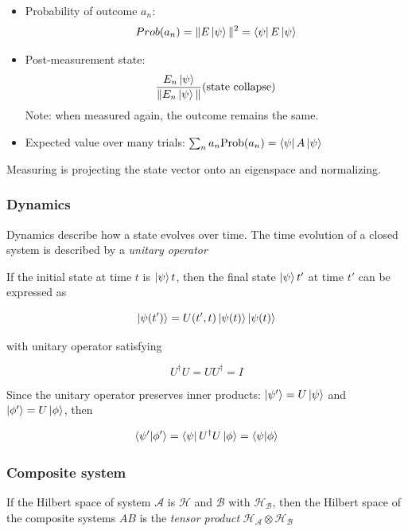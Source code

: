 \documentclass[11pt]{article}
\begin{document}
\begin{itemize}
	\item Probability of outcome $a_n$:
	      \[
		      Prob(a_n) = \|E\ket{\psi}\|^2 = \bra{\psi}E\ket{\psi}
	      \]
	\item Post-measurement state:
	      \[
		      \frac{E_n \ket{\psi}}{\|E_n\ket{\psi}\|} \text{(state collapse)}
	      \]
	      Note: when measured again, the outcome remains the same.

	\item Expected value over many trials: $\sum_n a_n \text{Prob}(a_n) = \bra{\psi}A\ket{\psi}$
\end{itemize}

Measuring is projecting the state vector onto an eigenspace and normalizing.

\subsubsection{Dynamics}

Dynamics describe how a state evolves over time. The time evolution of a closed system is described by a \textit{unitary operator}

If the initial state at time $t$ is $\ket{\psi}t$, then the final state $\ket{\psi}t'$ at time $t'$ can be expressed as

\begin{equation*}
	\ket{\psi(t')} = U(t', t)\ket{\psi(t)}\ket{\psi(t)}
\end{equation*}

with unitary operator satisfying

\begin{equation*}
	U^{\dagger}U = UU^{\dagger} = I
\end{equation*}

Since the unitary operator preserves inner products: $\ket{\psi'} = U\ket{\psi}$ and $\ket{\phi'} = U\ket{\phi}$, then

\begin{equation*}
	\braket{\psi'|\phi'} = \bra{\psi}U^{\dagger}U\ket{\phi} = \braket{\psi|\phi}
\end{equation*}


\subsubsection{Composite system}

If the Hilbert space of system $\mathcal{A}$ is $\mathcal{H}$ and $\mathcal{B}$ with $\mathcal{H}_{\mathcal{B}}$, then the Hilbert space of the composite systems $AB$ is the \textit{tensor product} $\mathcal{H}_{\mathcal{A}} \otimes \mathcal{H}_{\mathcal{B}}$
\end{document}

